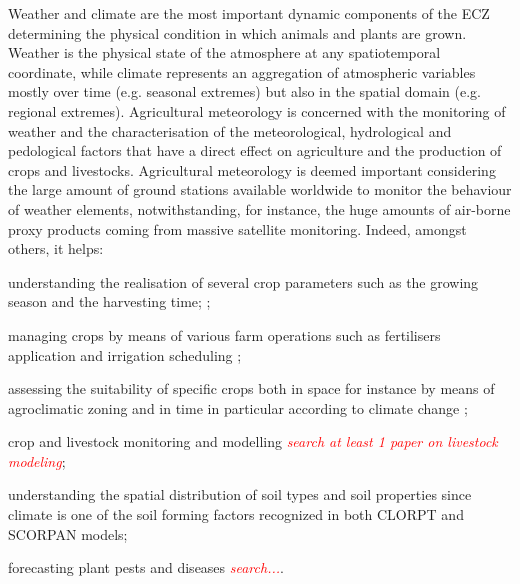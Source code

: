 \documentclass[authoryear,preprint,review,12pt]{elsarticle}
\newcommand{\note}[1]{\emph{\textcolor{red}{#1}}}
\begin{document}

Weather and climate are the most important dynamic components of the ECZ determining the physical condition in which animals and plants are grown.
Weather is the physical state of the atmosphere at any spatiotemporal coordinate, while climate represents an aggregation of atmospheric variables mostly over time (e.g. seasonal extremes) but also in the spatial domain (e.g. regional extremes).
Agricultural meteorology is concerned with the monitoring of weather and the characterisation of the meteorological, hydrological and pedological factors that have a direct effect on agriculture and the production of crops and livestocks.
Agricultural meteorology is deemed important considering the large amount of ground stations available worldwide to monitor the behaviour of weather elements, notwithstanding, for instance, the huge amounts of air-borne proxy products coming from massive satellite monitoring.
Indeed, amongst others, it helps: 
    \begin{enumerate*}
        \item understanding the realisation of several crop parameters such as the growing season and the harvesting time;  \citep{Hoogenboom:agrometeo-swat:2000,Chou2019,Madhukar2021,Richmond2022};
        \item managing crops by means of various farm operations such as fertilisers application and irrigation scheduling \citep{Cammarano2021,Chen2020};
        \item assessing the suitability of specific crops both in space for instance by means of agroclimatic zoning and in time in particular according to climate change \citep{Rokochynskiy2020,Jiang2020};
        \item crop and livestock monitoring and modelling \citep{Vogel2021,Zhang2022} \note{search at least 1 paper on livestock modeling};
        \item understanding the spatial distribution of soil types and soil properties since climate is one of the soil forming factors recognized in both CLORPT \citep{jenny:clorpt:1941} and SCORPAN \citep{McBratney:scorpan:2003} models;
        \item forecasting plant pests and diseases \note{search...}.
    \end{enumerate*}
\end{document}
